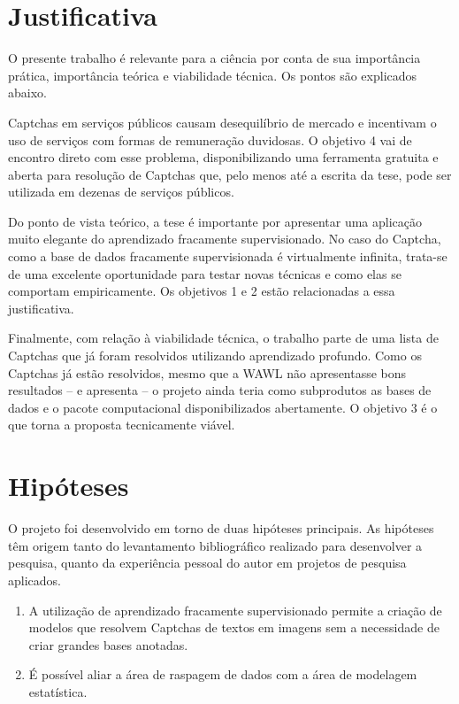\documentclass[12pt,twoside,brazilian]{book}
\begin{document}
\hypertarget{sec-justificativa}{%
\section{Justificativa}\label{sec-justificativa}}

O presente trabalho é relevante para a ciência por conta de sua
importância prática, importância teórica e viabilidade técnica. Os
pontos são explicados abaixo.

Captchas em serviços públicos causam desequilíbrio de mercado e
incentivam o uso de serviços com formas de remuneração duvidosas. O
objetivo 4 vai de encontro direto com esse problema, disponibilizando
uma ferramenta gratuita e aberta para resolução de Captchas que, pelo
menos até a escrita da tese, pode ser utilizada em dezenas de serviços
públicos.

Do ponto de vista teórico, a tese é importante por apresentar uma
aplicação muito elegante do aprendizado fracamente supervisionado. No
caso do Captcha, como a base de dados fracamente supervisionada é
virtualmente infinita, trata-se de uma excelente oportunidade para
testar novas técnicas e como elas se comportam empiricamente. Os
objetivos 1 e 2 estão relacionadas a essa justificativa.

Finalmente, com relação à viabilidade técnica, o trabalho parte de uma
lista de Captchas que já foram resolvidos utilizando aprendizado
profundo. Como os Captchas já estão resolvidos, mesmo que a WAWL não
apresentasse bons resultados -- e apresenta -- o projeto ainda teria
como subprodutos as bases de dados e o pacote computacional
disponibilizados abertamente. O objetivo 3 é o que torna a proposta
tecnicamente viável.

\hypertarget{sec-hipoteses}{%
\section{Hipóteses}\label{sec-hipoteses}}

O projeto foi desenvolvido em torno de duas hipóteses principais. As
hipóteses têm origem tanto do levantamento bibliográfico realizado para
desenvolver a pesquisa, quanto da experiência pessoal do autor em
projetos de pesquisa aplicados.

\begin{enumerate}
\def\labelenumi{\arabic{enumi}.}
\item
  A utilização de aprendizado fracamente supervisionado permite a
  criação de modelos que resolvem Captchas de textos em imagens sem a
  necessidade de criar grandes bases anotadas.
\item
  É possível aliar a área de raspagem de dados com a área de modelagem
  estatística.
\end{enumerate}
\end{document}

